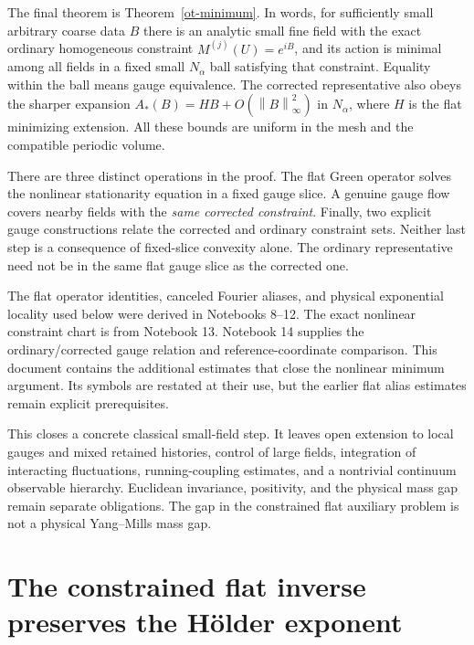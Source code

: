 \documentclass[11pt]{article}
\theoremstyle{remark}
\newcommand{\norm}[1]{\left\|#1\right\|}
\begin{document}
The final theorem is Theorem~\ref{ot-minimum}. In words,
for sufficiently small arbitrary coarse data $B$ there is an
analytic small fine field with the exact ordinary homogeneous
constraint $M^{(j)}(U)=e^{iB}$, and its action is minimal among
all fields in a fixed small $N_\alpha$ ball satisfying that
constraint. Equality within the ball means gauge equivalence.
The corrected representative also obeys the sharper expansion
$A_*(B)=HB+O(\norm{B}_\infty^2)$ in $N_\alpha$, where $H$
is the flat minimizing extension. All these bounds are uniform
in the mesh and the compatible periodic volume.

There are three distinct operations in the proof. The flat
Green operator solves the nonlinear stationarity equation in
a fixed gauge slice. A genuine gauge flow covers nearby fields
with the \emph{same corrected constraint}. Finally, two explicit
gauge constructions relate the corrected and ordinary constraint
sets. Neither last step is a consequence of fixed-slice convexity
alone. The ordinary representative need not be in the same flat
gauge slice as the corrected one.

The flat operator identities, canceled Fourier aliases, and
physical exponential locality used below were derived in
Notebooks 8--12. The exact nonlinear constraint chart is from
Notebook 13. Notebook 14 supplies the ordinary/corrected gauge
relation and reference-coordinate comparison. This document
contains the additional estimates that close the nonlinear
minimum argument. Its symbols are restated at their use, but
the earlier flat alias estimates remain explicit prerequisites.

This closes a concrete classical small-field step. It leaves
open extension to local gauges and mixed retained histories,
control of large fields, integration of interacting fluctuations,
running-coupling estimates, and a nontrivial continuum observable
hierarchy. Euclidean invariance, positivity, and the physical
mass gap remain separate obligations. The gap in the constrained
flat auxiliary problem is not a physical Yang--Mills mass gap.



\section{The constrained flat inverse preserves the H\"older exponent}
\label{cg-section}
\end{document}
